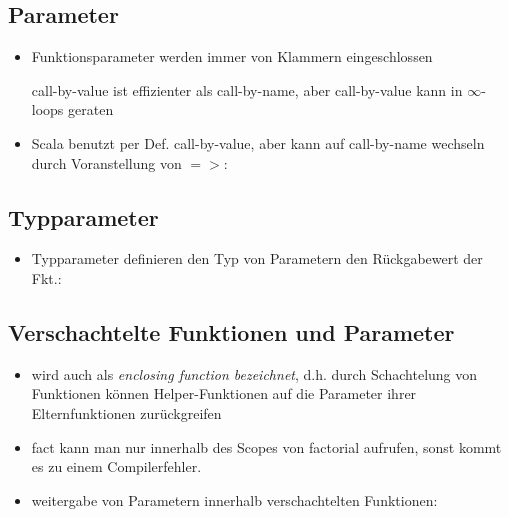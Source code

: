 \subsection{Parameter}
\begin{itemize}
  \item Funktionsparameter werden immer von Klammern eingeschlossen
  
  
  call-by-value ist effizienter als call-by-name, aber call-by-value
  kann in $\infty$-loops geraten
    
  \item Scala benutzt per Def. call-by-value, aber kann auf call-by-name
  wechseln durch Voranstellung von $=>$:
  
  
  
\end{itemize}


\subsection{Typparameter}
\begin{itemize}
  \item Typparameter definieren den Typ von Parametern \oder den
  Rückgabewert der Fkt.:

  
\end{itemize}


\subsection{Verschachtelte Funktionen und Parameter}
\begin{itemize}
  \item wird auch als \textit{enclosing function bezeichnet}, d.h. durch
  Schachtelung von Funktionen können Helper-Funktionen auf die Parameter ihrer
  Elternfunktionen zurückgreifen
  \item 
  
  fact kann man nur innerhalb des Scopes von factorial aufrufen, sonst kommt
  es zu einem Compilerfehler.
  
  \item weitergabe von Parametern innerhalb verschachtelten Funktionen:
  
    

\end{itemize}


